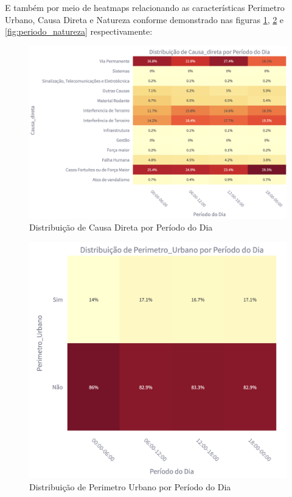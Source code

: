 \documentclass[conference]{IEEEtran}
\begin{document}
E também por meio de heatmaps relacionando as características Perimetro Urbano, Causa Direta e Natureza conforme demonstrado nas figuras \ref{fig:periodo_causa_direta}, \ref{fig:periodo_perimetro_urbano} e \ref{fig:periodo_natureza} respectivamente:

\begin{figure}[!htb]
    \centering
    \includegraphics[width=0.9\linewidth]{periodo_causa_direta.png}
    \caption{Distribuição de Causa Direta por Período do Dia}
    \label{fig:periodo_causa_direta}
\end{figure}

\begin{figure}[!htb]
    \centering
    \includegraphics[width=0.95\linewidth]{periodo_perimetro_urbano.png}
    \caption{Distribuição de Perimetro Urbano por Período do Dia}
    \label{fig:periodo_perimetro_urbano}
\end{figure}
\end{document}
